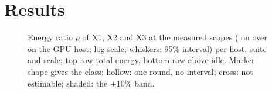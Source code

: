 \documentclass[sigconf]{acmart}
\begin{document}
\section{Results}
\label{sec:results}

\begin{figure}[t]
\centering
\caption{Energy ratio $\rho$ of X1, X2 and X3 at the measured scopes ( on \CG{} over
 on the GPU host; log scale; whiskers: 95\% interval) per host, suite and scale; top row
total energy, bottom row above idle. Marker shape gives the class; hollow: one round, no interval;
cross: not estimable; shaded: the $\pm$10\% band.}
\label{fig:energy}
\end{figure}
\end{document}
